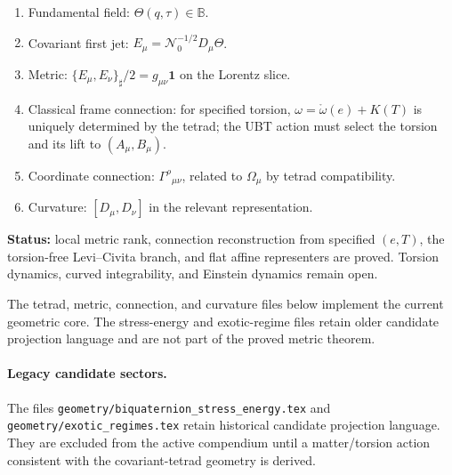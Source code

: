 \documentclass[12pt,a4paper]{article}
\begin{document}
\begin{tcolorbox}[colback=green!5!white,colframe=green!75!black,title=Canonical geometric hierarchy]
\begin{enumerate}
 \item Fundamental field: $\Theta(q,\tau)\in\mathbb B$.
 \item Covariant first jet: $E_\mu=\mathcal N_0^{-1/2}D_\mu\Theta$.
 \item Metric: $\{E_\mu,E_\nu\}_\sharp/2=g_{\mu\nu}\mathbf1$ on the Lorentz slice.
 \item Classical frame connection: for specified torsion,
       $\omega=\mathring\omega(e)+K(T)$ is uniquely determined by the tetrad;
       the UBT action must select the torsion and its lift to $(A_\mu,B_\mu)$.
 \item Coordinate connection: $\Gamma^\rho{}_{\mu\nu}$, related to $\Omega_\mu$ by tetrad compatibility.
 \item Curvature: $[D_\mu,D_\nu]$ in the relevant representation.
\end{enumerate}
\textbf{Status:} local metric rank, connection reconstruction from specified
$(e,T)$, the torsion-free Levi--Civita branch, and flat affine representers are
proved.  Torsion dynamics, curved integrability, and Einstein dynamics remain open.
\end{tcolorbox}

\begin{tcolorbox}[colback=yellow!5!white,colframe=orange!65!black,title=Matter-sector caution]
The tetrad, metric, connection, and curvature files below implement the current
geometric core.  The stress-energy and exotic-regime files retain older
candidate projection language and are not part of the proved metric theorem.
\end{tcolorbox}







\paragraph{Legacy candidate sectors.}
The files \texttt{geometry/biquaternion\_stress\_energy.tex} and
\texttt{geometry/exotic\_regimes.tex} retain historical candidate
projection language.  They are excluded from the active compendium until a
matter/torsion action consistent with the covariant-tetrad geometry is derived.
\end{document}
